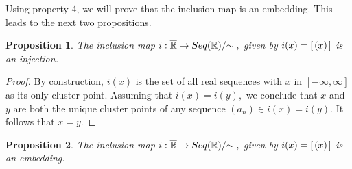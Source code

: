 \documentclass{amsart}
\theoremstyle{definition}
\theoremstyle{plain}
\newtheorem{proposition}{Proposition}
\begin{document}
Using property 4, we will prove that the inclusion map is an embedding. This leads to the next two propositions.

\begin{proposition} The inclusion map $i: \overline{\mathbb{R}} \to Seq(\mathbb{R})/ \hspace{-1mm} \sim \hspace{1mm},$ given by $i(x) = [\hspace{0.5mm} (x) \hspace{0.5mm}] $ is an injection.  
\end{proposition}
\begin{proof} 
 By construction, $i(x)$ is the set of all real sequences with $x$ in $[-\infty ,\infty]$ as its only cluster point. Assuming that $i(x) = i(y),$ we conclude that $x$ and $y$ are both the unique cluster points of any sequence $(a_n) \in i(x) = i(y)$. It follows that $x = y$. 




\end{proof}

\begin{proposition} The inclusion map $i: \overline{\mathbb{R}} \to Seq(\mathbb{R})/ \hspace{-1mm} \sim \hspace{1mm},$ given by $i(x) = [\hspace{0.5mm} (x) \hspace{0.5mm}] $ is an embedding. 

\end{proposition}
\end{document}
